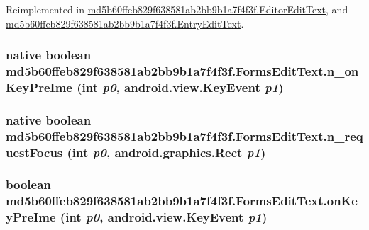 Reimplemented in \hyperlink{classmd5b60ffeb829f638581ab2bb9b1a7f4f3f_1_1_editor_edit_text_acf56440a58971488b7292ee85983d77}{md5b60ffeb829f638581ab2bb9b1a7f4f3f.EditorEditText}, and \hyperlink{classmd5b60ffeb829f638581ab2bb9b1a7f4f3f_1_1_entry_edit_text_788af3e6d9362437aec111b13b19f2c3}{md5b60ffeb829f638581ab2bb9b1a7f4f3f.EntryEditText}.\hypertarget{classmd5b60ffeb829f638581ab2bb9b1a7f4f3f_1_1_forms_edit_text_dd66e61307ce4c0dcfdbca64e20e3adc}{
\subsubsection[{n\_\-onKeyPreIme}]{\setlength{\rightskip}{0pt plus 5cm}native boolean md5b60ffeb829f638581ab2bb9b1a7f4f3f.FormsEditText.n\_\-onKeyPreIme (int {\em p0}, \/  android.view.KeyEvent {\em p1})}}
\label{classmd5b60ffeb829f638581ab2bb9b1a7f4f3f_1_1_forms_edit_text_dd66e61307ce4c0dcfdbca64e20e3adc}


\hypertarget{classmd5b60ffeb829f638581ab2bb9b1a7f4f3f_1_1_forms_edit_text_13033b8663d0fb0483a889604843bed6}{
\subsubsection[{n\_\-requestFocus}]{\setlength{\rightskip}{0pt plus 5cm}native boolean md5b60ffeb829f638581ab2bb9b1a7f4f3f.FormsEditText.n\_\-requestFocus (int {\em p0}, \/  android.graphics.Rect {\em p1})}}
\label{classmd5b60ffeb829f638581ab2bb9b1a7f4f3f_1_1_forms_edit_text_13033b8663d0fb0483a889604843bed6}


\hypertarget{classmd5b60ffeb829f638581ab2bb9b1a7f4f3f_1_1_forms_edit_text_9da716bfd9ed6cc587648da33453634a}{
\subsubsection[{onKeyPreIme}]{\setlength{\rightskip}{0pt plus 5cm}boolean md5b60ffeb829f638581ab2bb9b1a7f4f3f.FormsEditText.onKeyPreIme (int {\em p0}, \/  android.view.KeyEvent {\em p1})}}
\label{classmd5b60ffeb829f638581ab2bb9b1a7f4f3f_1_1_forms_edit_text_9da716bfd9ed6cc587648da33453634a}


